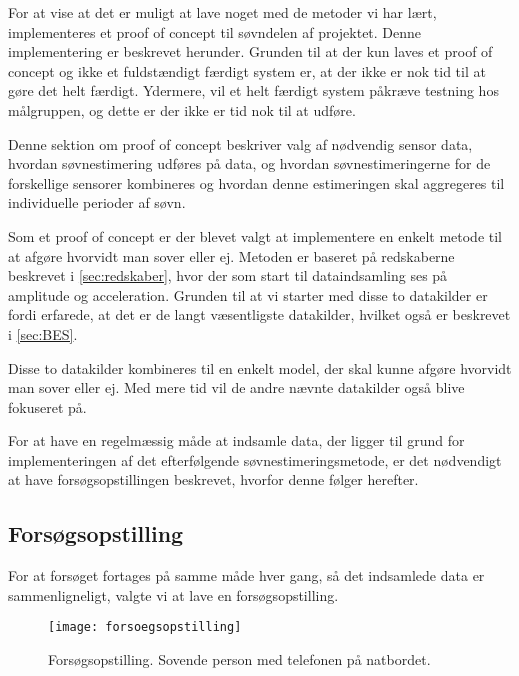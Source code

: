 For at vise at det er muligt at lave noget med de metoder vi har lært, implementeres et proof of concept til søvndelen af projektet. 
Denne implementering er beskrevet herunder.
Grunden til at der kun laves et proof of concept og ikke et fuldstændigt færdigt system er, at der ikke er nok tid til at gøre det helt færdigt. 
Ydermere, vil et helt færdigt system påkræve testning hos målgruppen, og dette er der ikke er tid nok til at udføre. 

Denne sektion om proof of concept beskriver valg af nødvendig sensor data, hvordan søvnestimering udføres på data, og hvordan søvnestimeringerne for de forskellige sensorer kombineres og hvordan denne estimeringen skal aggregeres til individuelle perioder af søvn.


Som et proof of concept er der blevet valgt at implementere en enkelt metode til at afgøre hvorvidt man sover eller ej.
Metoden er baseret på redskaberne beskrevet i \cref{sec:redskaber}, hvor der som start til dataindsamling ses på amplitude og acceleration.
Grunden til at vi starter med disse to datakilder er fordi \citet{6563918} erfarede, at det er de langt væsentligste datakilder, hvilket også er beskrevet i \cref{sec:BES}.

Disse to datakilder kombineres til en enkelt model, der skal kunne afgøre hvorvidt man sover eller ej.
Med mere tid vil de andre nævnte datakilder også blive fokuseret på.

For at have en regelmæssig måde at indsamle data, der ligger til grund for implementeringen af det efterfølgende søvnestimeringsmetode, er det nødvendigt at have forsøgsopstillingen beskrevet, hvorfor denne følger herefter.
\subsection{Forsøgsopstilling}
For at forsøget fortages på samme måde hver gang, så det indsamlede data er sammenligneligt, valgte vi at lave en forsøgsopstilling.
\begin{figure}[h]
	\centering
	\texttt{[image: forsoegsopstilling]}
	\caption{Forsøgsopstilling. Sovende person med telefonen på natbordet.}
	\label{fig:forsoegopstillings}
\end{figure}

